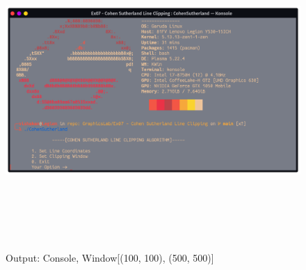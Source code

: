 \documentclass[12pt, a4]{article}
\begin{document}
\subsection*{}
\begin{figure}[h]
\centering
\caption{Output: Console, Window[(100, 100), (500, 500)]}
\includegraphics[height=12cm, width=17cm]{Outputs/Console-1.png}
\end{figure}

\newpage
\end{document}
